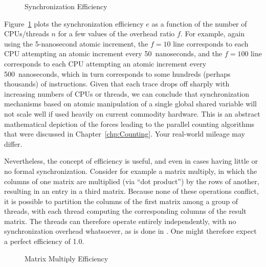 \begin{figure}
\centering
{}
\caption{Synchronization Efficiency}
\label{fig:SMPdesign:Synchronization Efficiency}
\end{figure}

Figure~\ref{fig:SMPdesign:Synchronization Efficiency} plots the synchronization
efficiency $e$ as a function of the number of CPUs/threads $n$ for
a few values of the overhead ratio $f$.
For example, again using the 5-nanosecond atomic increment, the $f=10$
line corresponds to each CPU attempting an atomic increment every
50~nanoseconds, and the $f=100$ line corresponds to each CPU attempting
an atomic increment every 500~nanoseconds, which in turn corresponds to
some hundreds (perhaps thousands) of instructions.
Given that each trace drops off sharply with increasing numbers of
CPUs or threads, we can conclude that
synchronization mechanisms based on
atomic manipulation of a single global shared variable will not
scale well if used heavily on current commodity hardware.
This is an abstract mathematical depiction of the forces leading
to the parallel counting algorithms that were discussed in
Chapter~\ref{chp:Counting}.
Your real-world mileage may differ.

Nevertheless, the concept of efficiency is useful, and even in cases
having little or no formal synchronization.
Consider for example a matrix multiply, in which the columns of one
matrix are multiplied (via ``dot product'') by the rows of another,
resulting in an entry in a third matrix.
Because none of these operations conflict, it is possible to partition
the columns of the first matrix among a group of threads, with each thread
computing the corresponding columns of the result matrix.
The threads can therefore operate entirely independently, with no
synchronization overhead whatsoever, as is done in
.
One might therefore expect a perfect efficiency of 1.0.

\begin{figure}
\centering
{}
\caption{Matrix Multiply Efficiency}
\label{fig:SMPdesign:Matrix Multiply Efficiency}
\end{figure}

